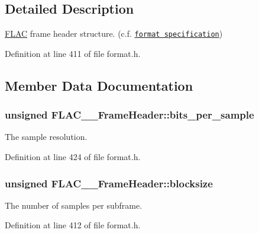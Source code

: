 \subsection{Detailed Description}
\hyperlink{namespace_f_l_a_c}{F\+L\+AC} frame header structure. (c.\+f. \href{../format.html#frame_header}{\tt format specification}) 

Definition at line 411 of file format.\+h.



\subsection{Member Data Documentation}
\subsubsection[{\texorpdfstring{bits\+\_\+per\+\_\+sample}{bits_per_sample}}]{\setlength{\rightskip}{0pt plus 5cm}unsigned F\+L\+A\+C\+\_\+\+\_\+\+Frame\+Header\+::bits\+\_\+per\+\_\+sample}\hypertarget{struct_f_l_a_c_____frame_header_ae1f4af58cbbb837adf670d12bc4e86f3}{}\label{struct_f_l_a_c_____frame_header_ae1f4af58cbbb837adf670d12bc4e86f3}
The sample resolution. 

Definition at line 424 of file format.\+h.

\subsubsection[{\texorpdfstring{blocksize}{blocksize}}]{\setlength{\rightskip}{0pt plus 5cm}unsigned F\+L\+A\+C\+\_\+\+\_\+\+Frame\+Header\+::blocksize}\hypertarget{struct_f_l_a_c_____frame_header_ace760def6dcbbde3d9d140e5bfda34b3}{}\label{struct_f_l_a_c_____frame_header_ace760def6dcbbde3d9d140e5bfda34b3}
The number of samples per subframe. 

Definition at line 412 of file format.\+h.

